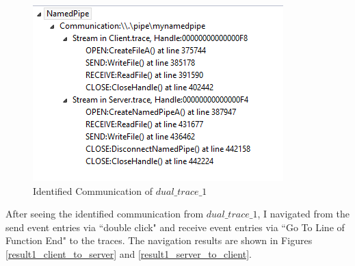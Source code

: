 \begin{figure}[H]
\centerline{\includegraphics[scale=0.65]{Figures/result1_communications}}
 \caption{Identified Communication of $dual\_trace\_1$}
\label{result1_communications}
\end{figure}


After seeing the identified communication from $dual\_trace\_1$, I navigated from the send event entries via ``double click" and receive event entries via ``Go To Line of Function End" to the traces. The navigation results are shown in Figures \ref{result1_client_to_server} and \ref{result1_server_to_client}.

